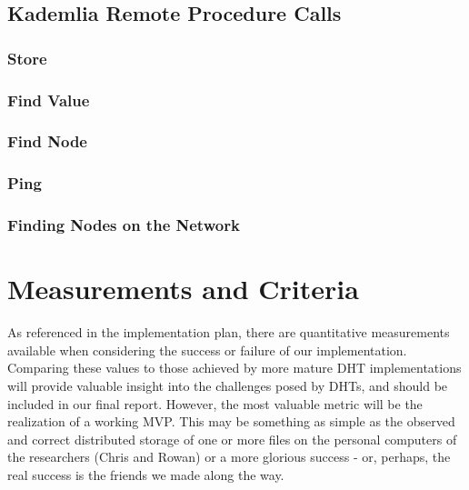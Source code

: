 \documentclass[12pt]{report}
\begin{document}
        \subsection{Kademlia Remote Procedure Calls}
            \subsubsection{Store}
            \subsubsection{Find Value}
            \subsubsection{Find Node}
            \subsubsection{Ping}
            \subsubsection{Finding Nodes on the Network}

    \section{Measurements and Criteria}
    As referenced in the implementation plan, there are quantitative
    measurements available when considering the success or failure of our
    implementation.  Comparing these values to those achieved by more mature
    DHT implementations will provide valuable insight into the challenges posed
    by DHTs, and should be included in our final report.  However, the most
    valuable metric will be the realization of a working MVP.  This may be
    something as simple as the observed and correct distributed storage of one
    or more files on the personal computers of the researchers (Chris and
    Rowan) or a more glorious success - or, perhaps, the real success is the
    friends we made along the way.
\end{document}
